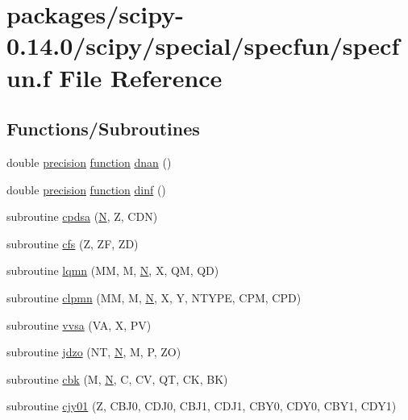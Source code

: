 \hypertarget{specfun_8f}{}\section{packages/scipy-\/0.14.0/scipy/special/specfun/specfun.f File Reference}
\label{specfun_8f}
\subsection*{Functions/\+Subroutines}
\begin{DoxyCompactItemize}
\item 
double \hyperlink{numinquire_8h_a2c8e616467665d0b2814d4c1589ba74e}{precision} \hyperlink{afunc_8m_a7b5e596df91eadea6c537c0825e894a7}{function} \hyperlink{specfun_8f_a78243169f13301ea70ba0851e526f51d}{dnan} ()
\item 
double \hyperlink{numinquire_8h_a2c8e616467665d0b2814d4c1589ba74e}{precision} \hyperlink{afunc_8m_a7b5e596df91eadea6c537c0825e894a7}{function} \hyperlink{specfun_8f_a285dc38209664f52049355c4ac5266b4}{dinf} ()
\item 
subroutine \hyperlink{specfun_8f_ad08a4b52862150c27880d890111d66c0}{cpdsa} (\hyperlink{polmisc_8c_a0240ac851181b84ac374872dc5434ee4}{N}, Z, C\+D\+N)
\item 
subroutine \hyperlink{specfun_8f_ab761a0bb5ec9001758b3fea84a881f4b}{cfs} (Z, Z\+F, Z\+D)
\item 
subroutine \hyperlink{specfun_8f_a5c8704c595b212a6b2ccc30b1040f679}{lqmn} (M\+M, M, \hyperlink{polmisc_8c_a0240ac851181b84ac374872dc5434ee4}{N}, X, Q\+M, Q\+D)
\item 
subroutine \hyperlink{specfun_8f_a49087203efb1c0212b1a744207737a2c}{clpmn} (M\+M, M, \hyperlink{polmisc_8c_a0240ac851181b84ac374872dc5434ee4}{N}, X, Y, N\+T\+Y\+P\+E, C\+P\+M, C\+P\+D)
\item 
subroutine \hyperlink{specfun_8f_a95065d268dce030619a1fe55468b6502}{vvsa} (V\+A, X, P\+V)
\item 
subroutine \hyperlink{specfun_8f_aee6371547cc395dcaba06232b0d9e7e9}{jdzo} (N\+T, \hyperlink{polmisc_8c_a0240ac851181b84ac374872dc5434ee4}{N}, M, P, Z\+O)
\item 
subroutine \hyperlink{specfun_8f_adf3ab1edc3aae5d8cec1a24a25344dcb}{cbk} (M, \hyperlink{polmisc_8c_a0240ac851181b84ac374872dc5434ee4}{N}, C, C\+V, Q\+T, C\+K, B\+K)
\item 
subroutine \hyperlink{specfun_8f_aa03217a095fe12670ce34876ea441c1f}{cjy01} (Z, C\+B\+J0, C\+D\+J0, C\+B\+J1, C\+D\+J1, C\+B\+Y0, C\+D\+Y0, C\+B\+Y1, C\+D\+Y1)

\end{DoxyCompactItemize}
